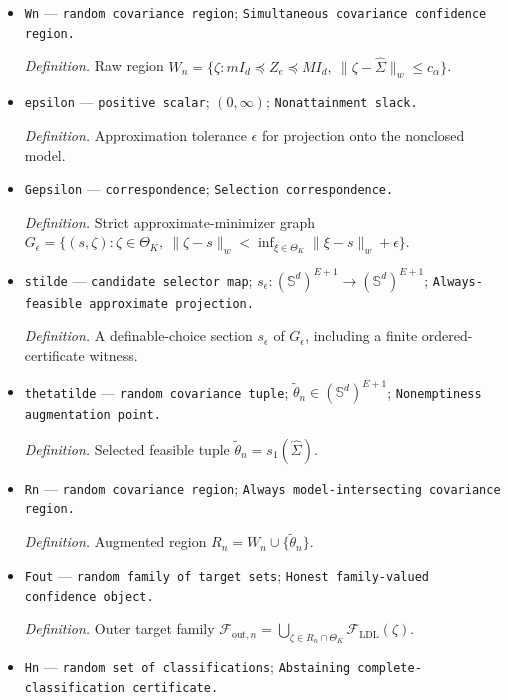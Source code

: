 \documentclass{article}
\begin{document}
\begin{itemize}
  \par\smallskip\noindent\emph{Definition.} Radius \(c_{\alpha}=\sqrt{V_{\max}/\alpha}\).
  \item \texttt{Wn} --- \texttt{random covariance region}; \texttt{Simultaneous covariance confidence region.}
  \par\smallskip\noindent\emph{Definition.} Raw region \(W_n=\{\zeta:mI_d\preceq Z_e\preceq MI_d,\ \lVert\zeta-\widehat\Sigma\rVert_w\le c_{\alpha}\}\).
  \item \texttt{epsilon} --- \texttt{positive scalar}; \((0,\infty)\); \texttt{Nonattainment slack.}
  \par\smallskip\noindent\emph{Definition.} Approximation tolerance \(\epsilon\) for projection onto the nonclosed model.
  \item \texttt{Gepsilon} --- \texttt{correspondence}; \texttt{Selection correspondence.}
  \par\smallskip\noindent\emph{Definition.} Strict approximate-minimizer graph \(G_{\epsilon}=\{(s,\zeta):\zeta\in\Theta_K,\ \lVert\zeta-s\rVert_w<\inf_{\xi\in\Theta_K}\lVert\xi-s\rVert_w+\epsilon\}\).
  \item \texttt{stilde} --- \texttt{candidate selector map}; \(s_{\epsilon}:(\mathbb S^d)^{E+1}\to(\mathbb S^d)^{E+1}\); \texttt{Always-\allowbreak{}feasible approximate projection.}
  \par\smallskip\noindent\emph{Definition.} A definable-choice section \(s_{\epsilon}\) of \(G_{\epsilon}\), including a finite ordered-certificate witness.
  \item \texttt{thetatilde} --- \texttt{random covariance tuple}; \(\widetilde\theta_n\in(\mathbb S^d)^{E+1}\); \texttt{Nonemptiness augmentation point.}
  \par\smallskip\noindent\emph{Definition.} Selected feasible tuple \(\widetilde\theta_n=s_1(\widehat\Sigma)\).
  \item \texttt{Rn} --- \texttt{random covariance region}; \texttt{Always model-\allowbreak{}intersecting covariance region.}
  \par\smallskip\noindent\emph{Definition.} Augmented region \(R_n=W_n\cup\{\widetilde\theta_n\}\).
  \item \texttt{Fout} --- \texttt{random family of target sets}; \texttt{Honest family-\allowbreak{}valued confidence object.}
  \par\smallskip\noindent\emph{Definition.} Outer target family \(\mathcal F_{\mathrm{out},n}=\bigcup_{\zeta\in R_n\cap\Theta_K}\mathcal F_{\mathrm{LDL}}(\zeta)\).
  \item \texttt{Hn} --- \texttt{random set of classifications}; \texttt{Abstaining complete-\allowbreak{}classification certificate.}

\end{itemize}
\end{document}
